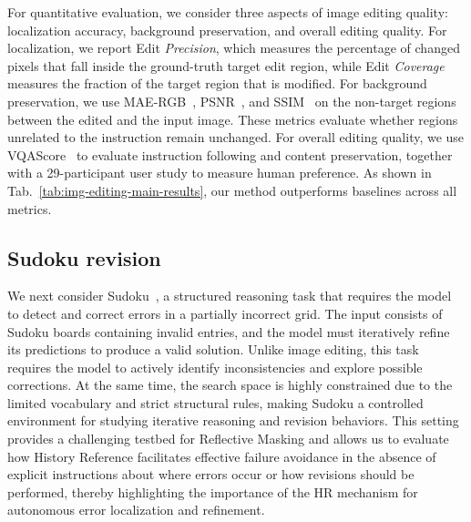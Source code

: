 \documentclass{llmxive}
\providecommand{\methodfull}{Reflective Masking\xspace}
\providecommand{\temporalmethodfull}{History Reference\xspace}
\providecommand{\temporalmethod}{HR\xspace}
\begin{document}
For quantitative evaluation, we consider three aspects of image editing quality: localization accuracy, background preservation, and overall editing quality.
For localization, we report Edit \textit{Precision}, which measures the percentage of changed pixels that fall inside the ground-truth target edit region, while Edit \textit{Coverage} measures the fraction of the target region that is modified.
For background preservation, we use MAE-RGB~\citep{willmott2005advantages}, PSNR~\citep{huynh2008scope}, and SSIM~\citep{wang2004image} on the non-target regions between the edited and the input image.
These metrics evaluate whether regions unrelated to the instruction remain unchanged.
For overall editing quality, we use VQAScore~\citep{lin2024evaluating} to evaluate instruction following and content preservation, together with a 29-participant user study to measure human preference.
As shown in Tab.~\ref{tab:img-editing-main-results}, our method outperforms baselines across all metrics.


\subsection{Sudoku revision}
\label{sec:sudoku-experiments}

We next consider Sudoku~\citep{palm2018recurrent,wang2019satnet}, a structured reasoning task that requires the model to detect and correct errors in a partially incorrect grid. The input consists of Sudoku boards containing invalid entries, and the model must iteratively refine its predictions to produce a valid solution. Unlike image editing, this task requires the model to actively identify inconsistencies and explore possible corrections. At the same time, the search space is highly constrained due to the limited vocabulary and strict structural rules, making Sudoku a controlled environment for studying iterative reasoning and revision behaviors. This setting provides a challenging testbed for \methodfull and allows us to evaluate how \temporalmethodfull facilitates effective failure avoidance in the absence of explicit instructions about where errors occur or how revisions should be performed, thereby highlighting the importance of the \temporalmethod mechanism for autonomous error localization and refinement.
\end{document}
